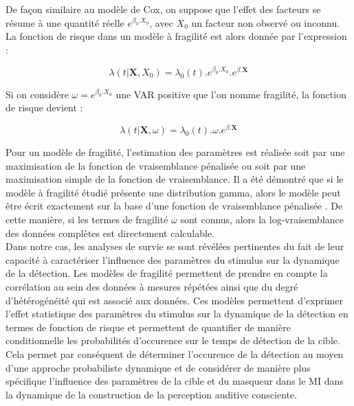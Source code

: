 De façon similaire au modèle de Cox, on suppose que l'effet des facteurs se résume à une quantité réelle $e^{\beta_0.X_0}$, avec $X_0$ un facteur non observé ou inconnu. 
La fonction de risque dans un modèle à fragilité est alors donnée par l'expression :

\begin{equation}
\lambda(t|\textbf{X},X_0) = \lambda_0(t).e^{\beta_0.X_0}.e^{\beta.\textbf{X}}
\end{equation}

Si on considère $\omega=e^{\beta_0.X_0}$ une VAR positive que l'on nomme fragilité, la fonction de risque devient :

\begin{equation}
\lambda(t|\textbf{X},\omega) = \lambda_0(t).\omega.e^{\beta.\textbf{X}}
\end{equation}

Pour un modèle de fragilité, l'estimation des paramètres est réalisée soit par une maximisation de la fonction de vraisemblance pénalisée ou soit par une maximisation simple de la fonction de vraisemblance. 
Il a été démontré que si le modèle à fragilité étudié présente une distribution gamma, alors le modèle peut être écrit exactement sur la base d'une fonction de vraisemblance pénalisée \citep{therneau2003penalized}. 
De cette manière, si les termes de fragilité $\omega$ sont connus, alors la log-vraisemblance des données complètes est directement calculable. \\

Dans notre cas, les analyses de survie se sont révélées pertinentes du fait de leur capacité à caractériser l'influence des paramètres du stimulus sur la dynamique de la détection. 
Les modèles de fragilité permettent de prendre en compte la corrélation au sein des données à mesures répétées ainsi que du degré d'hétérogénéité qui est associé aux données. 
Ces modèles permettent d'exprimer l'effet statistique des paramètres du stimulus sur la dynamique de la détection en termes de fonction de risque et permettent de quantifier de manière conditionnelle les probabilités d'occurence sur le temps de détection de la cible. 
Cela permet par conséquent de déterminer l'occurence de la détection au moyen d'une approche probabiliste dynamique et de considérer de manière plus spécifique l'influence des paramètres de la cible et du masqueur dans le MI dans la dynamique de la construction de la perception auditive consciente. 

\clearpage\null\newpage
